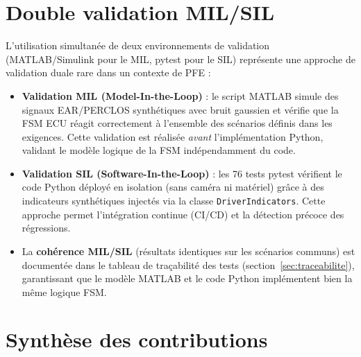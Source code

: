 \documentclass[12pt,a4paper]{report}
\begin{document}
\section{Double validation MIL/SIL}

L'utilisation simultan\'ee de deux environnements de validation (MATLAB/Simulink pour le MIL, pytest pour le SIL) repr\'esente une approche de validation duale rare dans un contexte de PFE :

\begin{itemize}
  \item \textbf{Validation MIL (Model-In-the-Loop)} : le script MATLAB simule des signaux EAR/PERCLOS synth\'etiques avec bruit gaussien et v\'erifie que la FSM ECU r\'eagit correctement \`a l'ensemble des sc\'enarios d\'efinis dans les exigences. Cette validation est r\'ealis\'ee \textit{avant} l'impl\'ementation Python, validant le mod\`ele logique de la FSM ind\'ependamment du code.
  \item \textbf{Validation SIL (Software-In-the-Loop)} : les 76 tests pytest v\'erifient le code Python d\'eploy\'e en isolation (sans cam\'era ni mat\'eriel) gr\^ace \`a des indicateurs synth\'etiques injectés via la classe \texttt{DriverIndicators}. Cette approche permet l'int\'egration continue (CI/CD) et la d\'etection pr\'ecoce des r\'egressions.
  \item La \textbf{coh\'erence MIL/SIL} (r\'esultats identiques sur les sc\'enarios communs) est document\'ee dans le tableau de traçabilit\'e des tests (section~\ref{sec:traceabilite}), garantissant que le mod\`ele MATLAB et le code Python impl\'ementent bien la m\^eme logique FSM.
\end{itemize}

\section{Synth\`ese des contributions}
\end{document}
